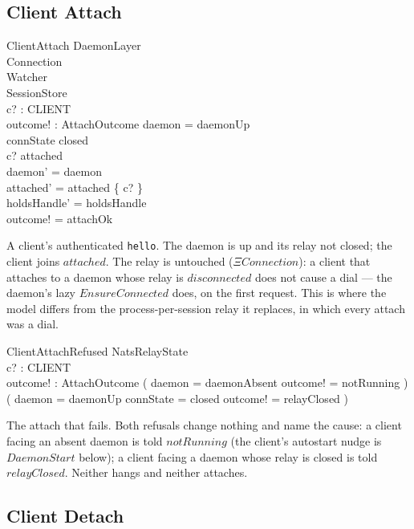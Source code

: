 \documentclass[a4paper,10pt,fleqn]{article}
\begin{document}
\subsection{Client Attach}

\begin{schema}{ClientAttach}
  \Delta DaemonLayer \\
  \Xi Connection \\
  \Xi Watcher \\
  \Xi SessionStore \\
  c? : CLIENT \\
  outcome! : AttachOutcome
  \where
  daemon = daemonUp \\
  connState \neq closed \\
  c? \notin attached \\
  daemon' = daemon \\
  attached' = attached \cup \{ c? \} \\
  holdsHandle' = holdsHandle \\
  outcome! = attachOk
\end{schema}

A client's authenticated \texttt{hello}.  The daemon is up and its relay
not closed; the client joins $attached$.  The relay is untouched
($\Xi Connection$): a client that attaches to a daemon whose relay is
$disconnected$ does not cause a dial --- the daemon's lazy
$EnsureConnected$ does, on the first request.  This is where the model
differs from the process-per-session relay it replaces, in which every
attach was a dial.

\begin{schema}{ClientAttachRefused}
  \Xi NatsRelayState \\
  c? : CLIENT \\
  outcome! : AttachOutcome
  \where
  ( daemon = daemonAbsent \land outcome! = notRunning ) \lor
  ( daemon = daemonUp \land connState = closed \land
    outcome! = relayClosed )
\end{schema}

The attach that fails.  Both refusals change nothing and name the cause:
a client facing an absent daemon is told $notRunning$ (the client's
autostart nudge is $DaemonStart$ below); a client facing a daemon whose
relay is closed is told $relayClosed$.  Neither hangs and neither
attaches.

\subsection{Client Detach}
\end{document}
